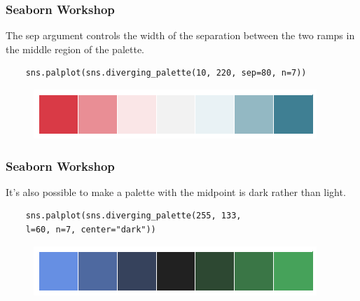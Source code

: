 \documentclass{beamer}
\begin{document}
\begin{frame}[fragile]
	\frametitle{Seaborn Workshop}
	\large
	
	
	The sep argument controls the width of the separation between the two ramps in the middle region of the palette.
	\begin{verbatim}
	sns.palplot(sns.diverging_palette(10, 220, sep=80, n=7))
	\end{verbatim}
	
	\begin{figure}
		\centering
		\includegraphics[width=0.7\linewidth]{images/color_palettes_62_0}
	\end{figure}
\end{frame}
\begin{frame}[fragile]
	\frametitle{Seaborn Workshop}
	\large
	It’s also possible to make a palette with the midpoint is dark rather than light.
	\begin{verbatim}
	sns.palplot(sns.diverging_palette(255, 133, 
	l=60, n=7, center="dark"))
	\end{verbatim}
	
	\begin{figure}
		\centering
		\includegraphics[width=0.7\linewidth]{images/color_palettes_64_0}
	\end{figure}
	
\end{frame}
\end{document}
